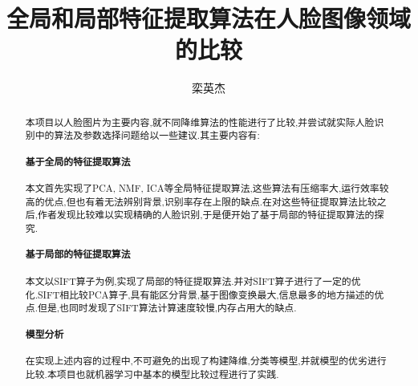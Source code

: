   \confidential{}%
  \title[兰州大学本科毕业设计实践~\LaTeX{}~模板]{全局和局部特征提取算法在人脸图像领域的比较}
  \author{栾英杰}%
\maketitle
\makeenglishtitle


\begin{abstract}

本项目以人脸图片为主要内容,就不同降维算法的性能进行了比较,并尝试就实际人脸识别中的算法及参数选择问题给以一些建议.其主要内容有:

\paragraph{基于全局的特征提取算法} 本文首先实现了PCA, NMF, ICA等全局特征提取算法,这些算法有压缩率大,运行效率较高的优点,但也有着无法辨别背景,识别率存在上限的缺点.在对这些特征提取算法比较之后,作者发现比较难以实现精确的人脸识别,于是便开始了基于局部的特征提取算法的探究.
\paragraph{基于局部的特征提取算法} 本文以SIFT算子为例,实现了局部的特征提取算法.并对SIFT算子进行了一定的优化.SIFT相比较PCA算子,具有能区分背景,基于图像变换最大,信息最多的地方描述的优点.但是,也同时发现了SIFT算法计算速度较慢,内存占用大的缺点.
\paragraph{模型分析} 在实现上述内容的过程中,不可避免的出现了构建降维,分类等模型,并就模型的优劣进行比较.本项目也就机器学习中基本的模型比较过程进行了实践.



\end{abstract}


